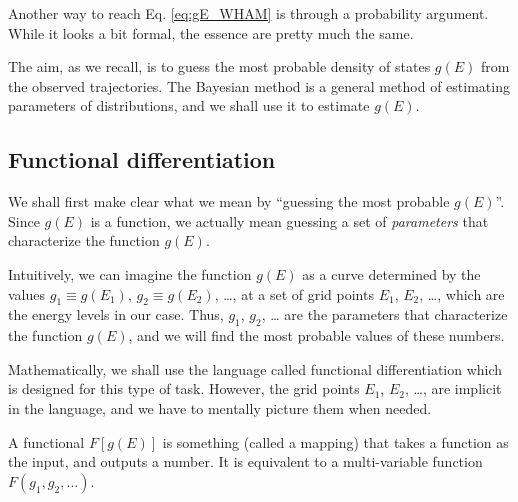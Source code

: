 \documentclass[aip,jcp,preprint,superscriptaddress]{revtex4-1}
\begin{document}
Another way to reach Eq. \eqref{eq:gE_WHAM}
is through a probability argument\cite{
bartels1997, *gallicchio2005, *habeck2007, *habeck2012, zhu2012}.
%
While it looks a bit formal,
the essence are pretty much the same.



The aim, as we recall, is to guess the most probable
density of states $g(E)$ from the observed trajectories.
%
The Bayesian method is a general method of
estimating parameters of distributions,
and we shall use it to estimate $g(E)$.



\subsection{Functional differentiation}



We shall first make clear
what we mean by ``guessing the most probable $g(E)$''.
%
Since $g(E)$ is a function,
we actually mean guessing a set of \emph{parameters}
that characterize the function $g(E)$.
%



Intuitively,
we can imagine the function $g(E)$
as a curve determined by the values
$g_1 \equiv g(E_1)$,
$g_2 \equiv g(E_2)$,
\dots,
at a set of grid points
$E_1$, $E_2$, \dots,
which are the energy levels in our case.
%
Thus,
$g_1$, $g_2$, \dots
are the parameters that characterize the function $g(E)$,
and we will find the most probable values
of these numbers.



Mathematically,
we shall use the language called functional differentiation
which is designed for this type of task.
%
However, the grid points $E_1$, $E_2$, \dots,
are implicit in the language,
and we have to mentally picture them when needed.



A functional $F[g(E)]$ is something (called a mapping)
that takes a function as the input,
and outputs a number.
%
It is equivalent to a multi-variable function
$F(g_1, g_2, \dots)$.
\end{document}
